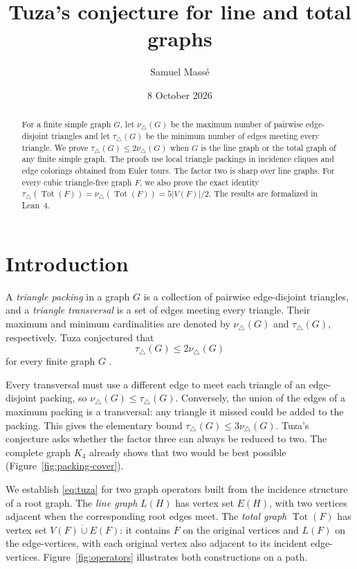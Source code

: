 \documentclass[11pt]{article}
\title{Tuza's conjecture for line and total graphs}
\author{Samuel Mass\'{e}}
\date{8 October 2026}
\theoremstyle{remark}
\newcommand{\tri}{\triangle}
\newcommand{\Tot}{\operatorname{Tot}}
\newcommand{\dd}{\mathbin{\dot\cup}}
\begin{document}
\maketitle

\begin{abstract}
For a finite simple graph $G$, let $\nu_\tri(G)$ be the maximum number of pairwise
edge-disjoint triangles and let $\tau_\tri(G)$ be the minimum number of edges
meeting every triangle.  We prove $\tau_\tri(G)\leq 2\nu_\tri(G)$ when $G$ is
the line graph or the total graph of any finite simple graph.  The proofs use
local triangle packings in incidence cliques and edge colorings obtained
from Euler tours.  The factor two is sharp over line graphs.  For every
cubic triangle-free graph $F$, we also prove the exact identity
$\tau_\tri(\Tot(F))=\nu_\tri(\Tot(F))=5|V(F)|/2$.
The results are formalized in Lean~4.
\end{abstract}

\section{Introduction}

A \emph{triangle packing} in a graph $G$ is a collection of pairwise
edge-disjoint triangles, and a \emph{triangle transversal} is a set of edges
meeting every triangle.  Their maximum and minimum cardinalities are denoted
by $\nu_\tri(G)$ and $\tau_\tri(G)$, respectively.  Tuza conjectured that
\begin{equation}\label{eq:tuza}
  \tau_\tri(G)\leq 2\nu_\tri(G)
\end{equation}
for every finite graph $G$ \cite{tuza1990}.

Every transversal must use a different edge to meet each triangle of an
edge-disjoint packing, so $\nu_\tri(G)\leq\tau_\tri(G)$.  Conversely, the
union of the edges of a maximum packing is a transversal: any triangle it
missed could be added to the packing.  This gives the elementary bound
$\tau_\tri(G)\leq3\nu_\tri(G)$.  Tuza's conjecture asks whether the factor
three can always be reduced to two.  The complete graph $K_4$ already shows
that two would be best possible (Figure~\ref{fig:packing-cover}).

We establish \eqref{eq:tuza} for two graph operators built from the incidence
structure of a root graph.  The \emph{line graph} $L(H)$ has vertex set
$E(H)$, with two vertices adjacent when the corresponding root edges meet.
The \emph{total graph} $\Tot(F)$ has vertex set $V(F)\dd E(F)$: it contains
$F$ on the original vertices and $L(F)$ on the edge-vertices, with each
original vertex also adjacent to its incident edge-vertices.
Figure~\ref{fig:operators} illustrates both constructions on a path.
\end{document}
